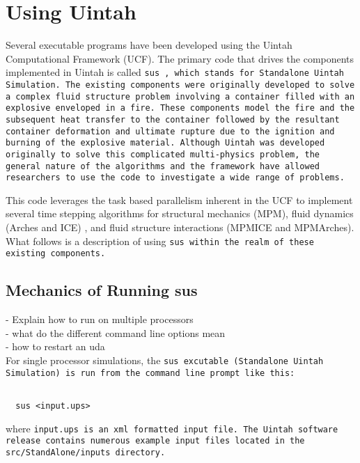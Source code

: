 \section{Using Uintah} \label{Sec:UCF}

Several executable programs have been developed using the Uintah
Computational Framework (UCF).  The primary code that drives the
components implemented in Uintah is called \tt sus
\normalfont, which stands for Standalone Uintah Simulation.  The existing
components were originally developed to solve a complex fluid structure problem
involving a container filled with an explosive enveloped in a fire.
These components model the fire and the subsequent heat transfer to the
container followed by the resultant container deformation and ultimate
rupture due to the ignition and burning of the explosive material.
Although Uintah was developed originally to solve this complicated
multi-physics problem, the general nature of the algorithms and the
framework have allowed researchers to use the code to investigate a
wide range of problems.

This code leverages the task based parallelism inherent in the UCF to
implement several time stepping algorithms for structural mechanics (MPM),
fluid dynamics (Arches and ICE) , and fluid structure interactions
(MPMICE and MPMArches).  What follows is a description of using
\tt sus \normalfont within the realm of these existing components.

\subsection{Mechanics of Running sus}
 - Explain how to run on multiple processors\\
 - what do the different command line options mean\\
 - how to restart an uda\\

For single processor simulations, the \tt sus \normalfont excutable
(Standalone Uintah Simulation) is run from the command line prompt
like this:
\begin{Verbatim}[fontsize=\footnotesize]
  
  sus <input.ups>

\end{Verbatim}
where \tt input.ups \normalfont is an xml formatted input file.  The Uintah
software release contains numerous example input files located in the
src/StandAlone/inputs directory.

